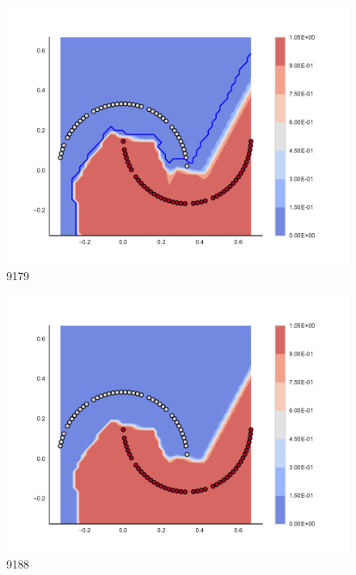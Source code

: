 \begin{subfigure}[b]{0.09\textwidth}
    \includegraphics[clip, trim=2.35cm 1.75cm 4.5cm 0cm,width=\textwidth]{img/convergence/9179.pdf}
    \caption{9179}
    \label{fig:convergence_9179}
\end{subfigure}
%
\begin{subfigure}[b]{0.09\textwidth}
    \includegraphics[clip, trim=2.35cm 1.75cm 4.5cm 0cm,width=\textwidth]{img/convergence/9188.pdf}
    \caption{9188}
    \label{fig:convergence_9188}
\end{subfigure}
%
